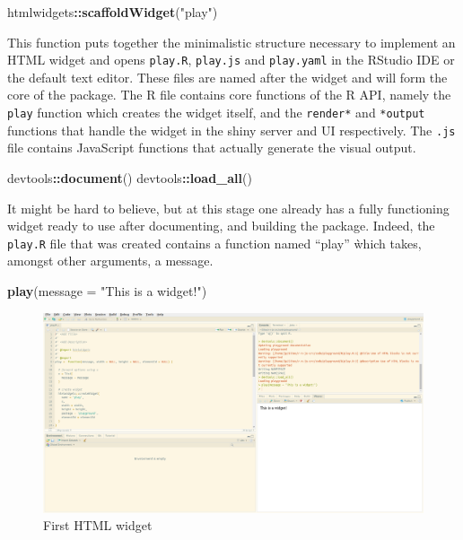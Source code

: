\documentclass[
]{krantz}
\makeatletter
\newenvironment{Shaded}{\begin{snugshade}}{\end{snugshade}}
\newcommand{\DataTypeTok}[1]{\textcolor[rgb]{0.27,0.27,0.27}{#1}}
\newcommand{\KeywordTok}[1]{\textcolor[rgb]{0.27,0.27,0.27}{\textbf{#1}}}
\newcommand{\NormalTok}[1]{#1}
\newcommand{\OperatorTok}[1]{\textcolor[rgb]{0.43,0.43,0.43}{\textbf{#1}}}
\newcommand{\StringTok}[1]{\textcolor[rgb]{0.5,0.5,0.5}{#1}}
\newenvironment{kframe}{%
\medskip{}
\setlength{\fboxsep}{.8em}
 \def\at@end@of@kframe{}%
 \ifinner\ifhmode%
  \def\at@end@of@kframe{\end{minipage}}%
  \begin{minipage}{\columnwidth}%
 \fi\fi%
 \def\FrameCommand##1{\hskip\@totalleftmargin \hskip-\fboxsep
 \colorbox{shadecolor}{##1}\hskip-\fboxsep
     \hskip-\linewidth \hskip-\@totalleftmargin \hskip\columnwidth}%
 \MakeFramed {\advance\hsize-\width
   \@totalleftmargin\z@ \linewidth\hsize
   \@setminipage}}%
 {\par\unskip\endMakeFramed%
 \at@end@of@kframe}
\renewenvironment{Shaded}{\begin{kframe}}{\end{kframe}}
\makeatother
\begin{document}
\begin{Shaded}
\begin{Highlighting}[]
\NormalTok{htmlwidgets}\OperatorTok{::}\KeywordTok{scaffoldWidget}\NormalTok{(}\StringTok{"play"}\NormalTok{)}
\end{Highlighting}
\end{Shaded}

This function puts together the minimalistic structure necessary to implement an HTML widget and opens \texttt{play.R}, \texttt{play.js} and \texttt{play.yaml} in the RStudio IDE or the default text editor. These files are named after the widget and will form the core of the package. The R file contains core functions of the R API, namely the \texttt{play} function which creates the widget itself, and the \texttt{render*} and \texttt{*output} functions that handle the widget in the shiny server and UI respectively. The \texttt{.js} file contains JavaScript functions that actually generate the visual output.

\begin{Shaded}
\begin{Highlighting}[]
\NormalTok{devtools}\OperatorTok{::}\KeywordTok{document}\NormalTok{()}
\NormalTok{devtools}\OperatorTok{::}\KeywordTok{load\_all}\NormalTok{()}
\end{Highlighting}
\end{Shaded}

It might be hard to believe, but at this stage one already has a fully functioning widget ready to use after documenting, and building the package. Indeed, the \texttt{play.R} file that was created contains a function named ``play'' ẁhich takes, amongst other arguments, a message.

\begin{Shaded}
\begin{Highlighting}[]
\KeywordTok{play}\NormalTok{(}\DataTypeTok{message =} \StringTok{"This is a widget!"}\NormalTok{)}
\end{Highlighting}
\end{Shaded}

\begin{figure}
\centering
\includegraphics{images/playground-1.png}
\caption{First HTML widget}
\end{figure}
\end{document}
